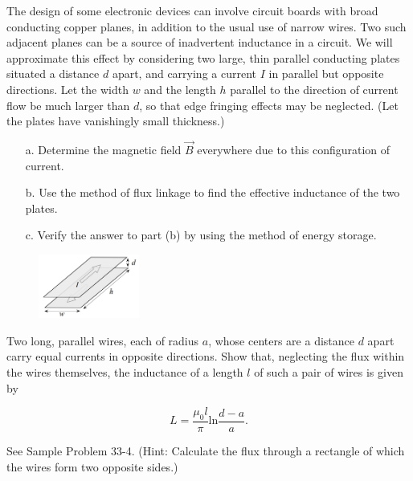 \documentclass[11pt,letterpaper,boxed]{pset}
\begin{document}
    \begin{problem} [SUP9.1]
        The design of some electronic devices can involve circuit boards with broad conducting copper planes, in addition to the usual use of narrow wires. Two such adjacent planes can be a source of inadvertent inductance in a circuit. We will approximate this effect by considering two large, thin parallel conducting plates situated a distance $d$ apart, and carrying a current $I$ in parallel but opposite directions. Let the width $w$ and the length $h$ parallel to the direction of current flow be much larger than $d$, so that edge fringing effects may be neglected. (Let the plates have vanishingly small thickness.)
        
        \begin{enumerate}
            \item [a.] Determine the magnetic field $\Vec{B}$ everywhere due to this configuration of current.
            \item [b.] Use the method of flux linkage to find the effective inductance of the two plates.
            \item [c.] Verify the answer to part (b) by using the method of energy storage.
        \end{enumerate}
    \end{problem}
    
    \begin{figure} [ht]
        \includegraphics[width=125px]{HW9Images/SUP9-1.png}
        \label{fig:E34-23}
    \end{figure}
    \newpage
    
    \begin{problem} [P36.3]
        Two long, parallel wires, each of radius $a$, whose centers are a distance $d$ apart carry equal currents in opposite directions. Show that, neglecting the flux within the wires themselves, the inductance of a length $l$ of such a pair of wires is given by 
        
        \[L = \frac{\mu_0l}{\pi} \text{ln}\frac{d-a}{a}.\]
        
        See Sample Problem 33-4. (Hint: Calculate the flux through a rectangle of which the wires form two opposite sides.)
    \end{problem}
    \newpage
    
\end{document}
